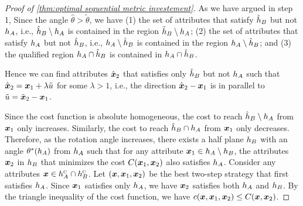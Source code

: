 \begin{proof}[Proof of \cref{thm:optimal sequential metric investement}]
    As we have argued in step 1, Since the angle $\hat \theta >\tilde \theta$, we have (1) the set of attributes that satisfy $\hat {h}_B$ but not $h_A$, i.e., $\hat {h}_B \setminus h_A$  is contained in the region $\tilde {h}_B \setminus h_A$; (2) the set of attributes that satisfy $h_A$ but not $\hat {h}_B$, i.e., $ h_A \setminus \hat{h}_B$  is contained in the region $h_A \setminus \tilde{h}_B$; and (3) the qualified region $h_A \cap \tilde {h}_B$ is contained in $h_A \cap \hat {h}_B$.
    
    Hence we can find  attributes $\hat {\boldsymbol{x}}_2$ that satisfies only $\hat {h}_B$ but not $h_A$ such that $\hat{\boldsymbol{x}}_2 =\boldsymbol{x}_1 +\lambda \tilde u$ for some $\lambda > 1$, i.e., the direction $\hat {\boldsymbol{x}}_2 -\boldsymbol{x}_1$ is in parallel to $\tilde u = \tilde{\boldsymbol{x}}_2 - \boldsymbol{x}_1$.

    Since the cost function is absolute homogeneous, 
    the cost to reach $\hat {h}_B \setminus h_A$ from $\boldsymbol{x}_1$ only increases.
    Similarly, the cost to reach $\hat {h}_B \cap h_A$ from $\boldsymbol{x}_1$ only decreases. 
    Therefore, as the rotation angle increases, there exists a half plane $h_B$ with an angle $\theta^*(h_A)$ from $h_A$ such that for any attribute $\boldsymbol{x}_1 \in h_A \setminus h_B$, the attributes $\boldsymbol{x}_2$ in $h_B$ that minimizes the cost $C(\boldsymbol{x}_1,\boldsymbol{x}_2)$ also satisfies $h_A$.
    Consider any attributes $\boldsymbol{x} \in h_A^{\textsc{c}} \cap h_B^{\textsc{c}}$. Let $(\boldsymbol{x},\boldsymbol{x}_1,\boldsymbol{x}_2)$ be the best two-step strategy that first satisfies $h_A$. Since $\boldsymbol{x}_1$ satisfies only $h_A$, we have $\boldsymbol{x}_2$ satisfies both $h_A$ and $h_B$. By the triangle inequality of the cost function, we have $c(\boldsymbol{x},\boldsymbol{x}_1,\boldsymbol{x}_2) \leq C(\boldsymbol{x},\boldsymbol{x}_2)$.
    

\end{proof}
